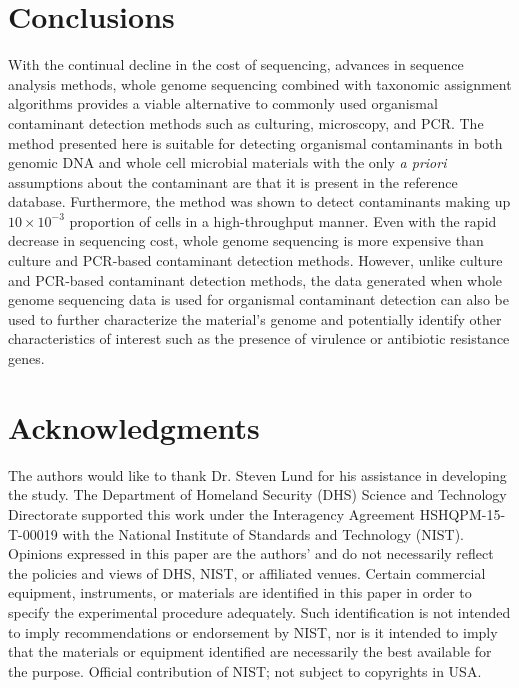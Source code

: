 \documentclass[fleqn,10pt,lineno]{wlpeerj}\usepackage[]{graphicx}\usepackage[]{color}
\begin{document}
\section*{Conclusions}
With the continual decline in the cost of sequencing, advances in sequence analysis methods, whole genome sequencing combined with taxonomic assignment algorithms provides a viable alternative to commonly used organismal contaminant detection methods such as culturing, microscopy, and PCR. 
The method presented here is suitable for detecting organismal contaminants in both genomic DNA and whole cell microbial materials with the only \textit{a priori} assumptions about the contaminant are that it is present in the reference database. 
Furthermore, the method was shown to detect contaminants making up $10 \times 10^{-3}$ proportion of cells in a high-throughput manner. 
Even with the rapid decrease in sequencing cost, whole genome sequencing is more expensive than culture and PCR-based contaminant detection methods. 
However, unlike culture and PCR-based contaminant detection methods, the data generated when whole genome sequencing data is used for organismal contaminant detection can also be used to further characterize the material's genome and potentially identify other characteristics of interest such as the presence of virulence or antibiotic resistance genes. 

\newpage

\section*{Acknowledgments}

The authors would like to thank Dr. Steven Lund for his assistance in developing the study.
The Department of Homeland Security (DHS) Science and Technology Directorate supported this work under the Interagency Agreement HSHQPM-15-T-00019 with the National Institute of Standards and Technology (NIST).
Opinions expressed in this paper are the authors’ and do not necessarily reflect the policies and views of DHS,  NIST, or affiliated venues.
Certain commercial equipment, instruments, or materials are identified in this paper in order to specify the experimental procedure adequately.
Such identification is not intended to imply recommendations or endorsement by NIST,
nor is it intended to imply that the materials or equipment identified are necessarily the best available for the purpose.
Official contribution of NIST; not subject to copyrights in USA.


\end{document}
